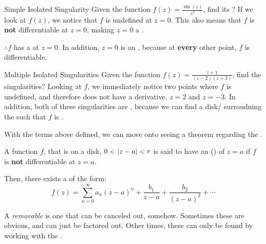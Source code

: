 \begin{example}{Simple Isolated Singularity}
  Given the function $f(z) = \frac{\sin(z)}{z^{2}}$, find its ?
  \tcblower{}
  If we look at $f(z)$, we notice that $f$ is undefined at $z=0$.
  This also means that $f$ is \textbf{not} differentiable at $z=0$, making $z=0$ a .

  $\therefore f$ has a  at $z=0$.
  In addition, $z=0$ is an  , because at \textbf{every} other point, $f$ is differentiable.
\end{example}

\begin{example}{Multiple Isolated Singularities}
  Given the function $f(z) = \frac{z+1}{(z-2) (z+3)}$, find the singularities?
  \tcblower{}
  Looking at $f$, we immediately notice two points where $f$ is undefined, and therefore does not have a derivative.
  $z=2$ and $z=-3$.
  In addition, both of these singularities are , because we can find a disk/ surroudning the  such that $f$ is .
\end{example}

With the terms above defined, we can move onto seeing a theorem regarding the .

\begin{theorem}\label{thm:Laurent_Series_Existence}
  A function $f$, that is  on a  disk, $0 < \left\lvert z-a \right\rvert < r$ is said to have an ()  of $z=a$ if $f$ is \textbf{not} differentiable at $z=a$.

  Then, there exists a  of the form:
  \begin{equation}\label{eq:Laurent_Series_Existence}
    f(z) = \sum_{n=0}^{\infty} a_{n} {(z-a)}^{n} + \frac{b_{1}}{z-a} + \frac{b_{2}}{{(z-a)}^{2}} + \cdots
  \end{equation}
\end{theorem}

\begin{definition}[Removable]\label{def:Removable}
  A \emph{removable}  is one that can be canceled out, somehow.
  Sometimes these are obvious, and can just be factored out.
  Other times, these can only be found by working with the .
\end{definition}

